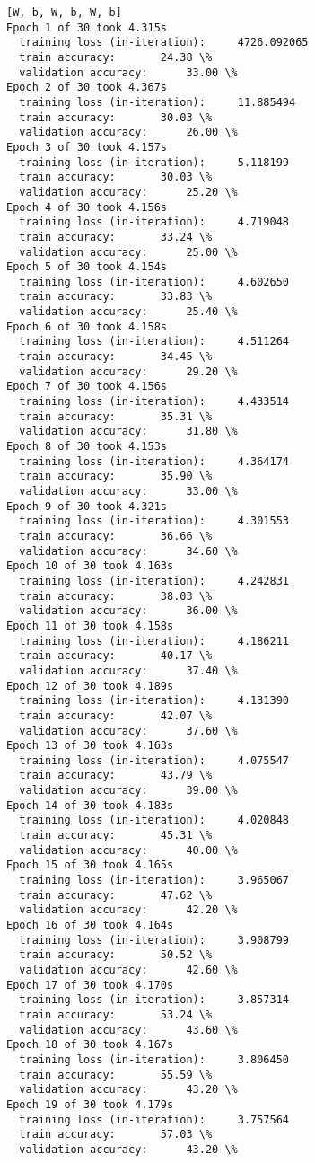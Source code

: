 \documentclass{article}
\begin{document}
    \begin{Verbatim}[commandchars=\\\{\}]
[W, b, W, b, W, b]
Epoch 1 of 30 took 4.315s
  training loss (in-iteration):		4726.092065
  train accuracy:		24.38 \%
  validation accuracy:		33.00 \%
Epoch 2 of 30 took 4.367s
  training loss (in-iteration):		11.885494
  train accuracy:		30.03 \%
  validation accuracy:		26.00 \%
Epoch 3 of 30 took 4.157s
  training loss (in-iteration):		5.118199
  train accuracy:		30.03 \%
  validation accuracy:		25.20 \%
Epoch 4 of 30 took 4.156s
  training loss (in-iteration):		4.719048
  train accuracy:		33.24 \%
  validation accuracy:		25.00 \%
Epoch 5 of 30 took 4.154s
  training loss (in-iteration):		4.602650
  train accuracy:		33.83 \%
  validation accuracy:		25.40 \%
Epoch 6 of 30 took 4.158s
  training loss (in-iteration):		4.511264
  train accuracy:		34.45 \%
  validation accuracy:		29.20 \%
Epoch 7 of 30 took 4.156s
  training loss (in-iteration):		4.433514
  train accuracy:		35.31 \%
  validation accuracy:		31.80 \%
Epoch 8 of 30 took 4.153s
  training loss (in-iteration):		4.364174
  train accuracy:		35.90 \%
  validation accuracy:		33.00 \%
Epoch 9 of 30 took 4.321s
  training loss (in-iteration):		4.301553
  train accuracy:		36.66 \%
  validation accuracy:		34.60 \%
Epoch 10 of 30 took 4.163s
  training loss (in-iteration):		4.242831
  train accuracy:		38.03 \%
  validation accuracy:		36.00 \%
Epoch 11 of 30 took 4.158s
  training loss (in-iteration):		4.186211
  train accuracy:		40.17 \%
  validation accuracy:		37.40 \%
Epoch 12 of 30 took 4.189s
  training loss (in-iteration):		4.131390
  train accuracy:		42.07 \%
  validation accuracy:		37.60 \%
Epoch 13 of 30 took 4.163s
  training loss (in-iteration):		4.075547
  train accuracy:		43.79 \%
  validation accuracy:		39.00 \%
Epoch 14 of 30 took 4.183s
  training loss (in-iteration):		4.020848
  train accuracy:		45.31 \%
  validation accuracy:		40.00 \%
Epoch 15 of 30 took 4.165s
  training loss (in-iteration):		3.965067
  train accuracy:		47.62 \%
  validation accuracy:		42.20 \%
Epoch 16 of 30 took 4.164s
  training loss (in-iteration):		3.908799
  train accuracy:		50.52 \%
  validation accuracy:		42.60 \%
Epoch 17 of 30 took 4.170s
  training loss (in-iteration):		3.857314
  train accuracy:		53.24 \%
  validation accuracy:		43.60 \%
Epoch 18 of 30 took 4.167s
  training loss (in-iteration):		3.806450
  train accuracy:		55.59 \%
  validation accuracy:		43.20 \%
Epoch 19 of 30 took 4.179s
  training loss (in-iteration):		3.757564
  train accuracy:		57.03 \%
  validation accuracy:		43.20 \%

\end{Verbatim}
\end{document}
